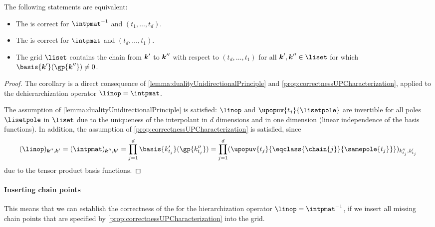 \begin{corollary}
  \label{cor:equivalentCorrectnessUPHierarchization}
  The following statements are equivalent:
  \begin{itemize}
    \item
    The \up is correct for $\intpmatinv$ and $(t_1, \dotsc, t_d)$.
    
    \item
    The \up is correct for $\intpmat$ and $(t_d, \dotsc, t_1)$.
    
    \item
    The grid $\liset$ contains the chain from ${\boldsymbol{k}}'$ to ${\boldsymbol{k}}''$
    with respect to $(t_d, \dotsc, t_1)$ for all $\*k', \*k'' \in \liset$
    for which $\basis{\*k'}(\gp{\*k''}) \not= 0$.
  \end{itemize}
\end{corollary}

\begin{proof}
  The corollary is a direct consequence of
  \cref{lemma:dualityUnidirectionalPrinciple} and
  \cref{prop:correctnessUPCharacterization},
  applied to the dehierarchization operator $\linop = \intpmat$.
  
  The assumption of \cref{lemma:dualityUnidirectionalPrinciple}
  is satisfied:
  $\linop$ and $\upopuv{t_j}{\lisetpole}$ are invertible
  for all poles $\lisetpole$ in $\liset$
  due to the uniqueness of the interpolant in $d$ dimensions
  and in one dimension
  (linear independence of the basis functions).
  In addition, the assumption of \cref{prop:correctnessUPCharacterization}
  is satisfied, since
  \begin{equation}
    (\linop)_{\*k'',\*k'}
    = (\intpmat)_{\*k'',\*k'}
    = \prod_{j=1}^d \basis{k'_{t_j}}(\gp{k''_{t_j}})
    = \prod_{j=1}^d
    (\upopuv{t_j}{\eqclass{\chain{j}}{\samepole{t_j}}})_{k''_{t_j},k'_{t_j}}
  \end{equation}
  due to the tensor product basis functions.
\end{proof}

\paragraph{Inserting chain points}

This means that we can establish the correctness of the \up
for the hierarchization operator $\linop = \intpmatinv$,
if we insert all missing chain points that are specified by
\cref{prop:correctnessUPCharacterization} into the grid.

